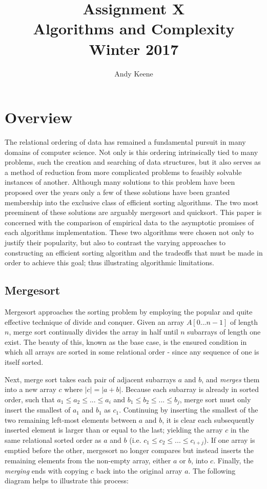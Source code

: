 \documentclass[11pt,letterpaper]{report}
\author{Andy Keene}
\title{Assignment X\\Algorithms and Complexity\\ Winter 2017}
\date{}
\begin{document}
\section*{Overview}
The relational ordering of data has remained a fundamental pursuit in many domains of computer science. Not only is this ordering intrinsically tied to many problems, such the creation and searching of data structures, but it also serves as a method of reduction from more complicated problems to feasibly solvable instances of another. Although many solutions to this problem have been proposed over the years only a few of these solutions have been granted membership into the exclusive class of efficient sorting algorithms. The two most preeminent of these solutions are arguably mergesort and quicksort. This paper is concerned with the comparison of empirical data to the asymptotic promises of each algorithms implementation. These two algorithms were chosen not only to justify their popularity, but also to contrast the varying approaches to constructing an efficient sorting algorithm and the tradeoffs that must be made in order to achieve this goal; thus illustrating algorithmic limitations.

\subsection*{Mergesort}			%
Mergesort approaches the sorting problem by employing the popular and quite effective technique of divide and conquer. Given an array $A[0...n-1]$ of length $n$, merge sort continually divides the array in half until $n$ subarrays of length one exist. The beauty of this, known as the base case, is the ensured condition in which all arrays are sorted in some relational order - since any sequence of one is itself sorted. 

Next, merge sort takes each pair of adjacent subarrays $a$ and $b$, and \emph{merges} them into a new array $c$ where $|c|=|a+b|$. Because each subarray is already in sorted order, such that $a_1 \leq a_2 \leq ... \leq a_i$ and $b_1 \leq b_2 \leq ... \leq b_j$, merge sort must only insert the smallest of $a_1$ and $b_1$ as $c_1$. Continuing by inserting the smallest of the two remaining left-most elements between $a$ and $b$, it is clear each subsequently inserted element is larger than or equal to the last; yielding the array $c$ in the same relational sorted order as $a$ and $b$ (i.e. $c_1 \leq c_2 \leq ... \leq c_{i+j}$). If one array is emptied before the other, mergesort no longer compares but instead inserts the remaining elements from the non-empty array, either $a$ or $b$, into $c$.  Finally, the \emph{merging} ends with copying $c$ back into the original array $a$. The following diagram helps to illustrate this process: 
\end{document}
